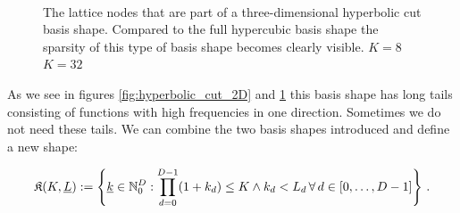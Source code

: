 \begin{figure}
  \centering
   \\
  \caption[Hyperbolic cut basis shape in three dimensions]{
    The lattice nodes that are part of a three-dimensional hyperbolic cut basis
    shape. Compared to the full hypercubic basis shape the sparsity of this
    type of basis shape becomes clearly visible.
     $K = 8$
     $K = 32$
    \label{fig:hyperbolic_cut_3D}
  }
\end{figure}

As we see in figures \ref{fig:hyperbolic_cut_2D} and \ref{fig:hyperbolic_cut_3D}
this basis shape has long tails consisting of functions with high frequencies
in one direction. Sometimes we do not need these tails. We can combine the two
basis shapes introduced and define a new shape:

\begin{definition}
  \begin{equation}
    \mathfrak{K}(K, \underline{L}) := \left\{ \underline{k} \in \mathbb{N}_0^D :
                             \prod_{d=0}^{D-1}(1+k_d) \leq K
                             \land k_d < L_d \,\forall\, d \in [0,\ldots,D-1] \right\} \,.
  \end{equation}
\end{definition}

